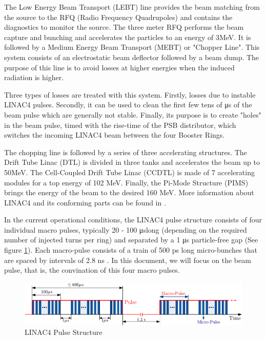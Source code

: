 The Low Energy Beam Transport (LEBT) line provides the beam matching from the source to the RFQ (Radio Frequency Quadrupoles) and contains the diagnostics to monitor the source. The three meter RFQ performs the beam capture and bunching and accelerates the particles to an energy of 3\si[]{\mega \electronvolt}. It is followed by a Medium Energy Beam Transport (MEBT) or "Chopper Line". This system consists of an electrostatic beam deflector followed by a beam dump. The purpose of this line is to avoid losses at higher energies when the induced radiation is higher. 

Three types of losses are treated with this system. Firstly, losses due to instable LINAC4 pulses. Secondly, it can be used to clean the first few tens of \si[]{\micro \second} of the beam pulse which are generally not stable. Finally, its purpose is to create "holes" in the beam pulse, timed with the rise-time of the PSB distributor, which switches the incoming LINAC4 beam between the four Booster Rings.  

The chopping line is followed by a series of three accelerating structures. The Drift Tube Linac (DTL) is divided in three tanks and accelerates the beam up to 50\si[]{\mega \electronvolt}. The Cell-Coupled Drift Tube Linac (CCDTL) is made of 7 accelerating modules for a top energy of 102 \si[]{\mega \electronvolt}. Finally, the Pi-Mode Structure (PIMS) brings the energy of the beam to the desired 160 \si[]{\mega\electronvolt}. More information about LINAC4 and its conforming parts can be found in \parencite*[]{ref:Linac4Technical}.  

In the current operational conditions, the LINAC4 pulse structure consists of four individual macro pulses, typically 20 - 100  \si[]{\micro \second}long (depending on the required number of injected turns per ring) and separated by a 1 \si[]{\micro \second} particle-free gap (See figure \ref{fig:Linac4PulseStruct}). Each macro-pulse consists of a train of 500 \si[]{\pico \second} long micro-bunches that are spaced by intervals of 2.8 \si[]{\nano \second} \parencite*[]{ref:Linac4PulseStruct}. In this document, we will focus on the beam pulse, that is, the convination of this four macro pulses.

\begin{figure}[h]
    \centering
    \includegraphics[width=1.0\columnwidth]{Figure_Linac4PulseStructure/Linac4_PulseStruct.pdf}
    \caption{LINAC4 Pulse Structure }
    \label{fig:Linac4PulseStruct}
\end{figure}


